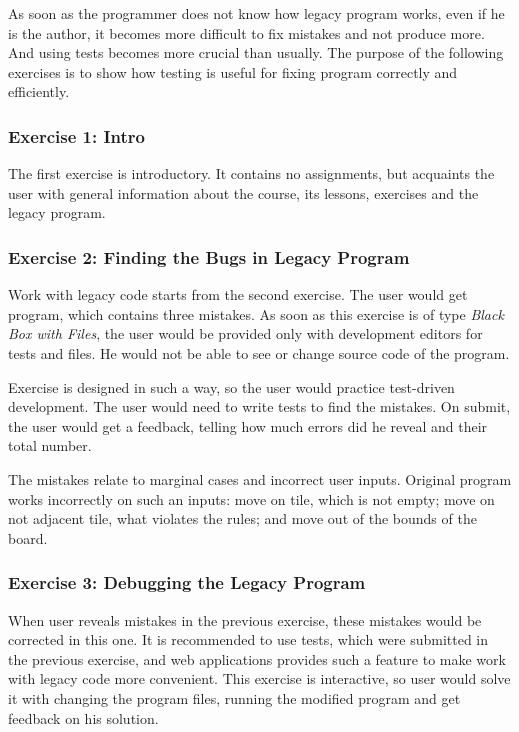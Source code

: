     As soon as the programmer does not know how legacy program works, even if he is the author, it becomes more difficult to fix mistakes and not produce more. And using tests becomes more crucial than usually. The purpose of the following exercises is to show how testing is useful for fixing program correctly and efficiently.
    
        \subsubsection{Exercise 1: Intro}
        The first exercise is introductory. It contains no assignments, but acquaints the user with general information about the course, its lessons, exercises and the legacy program.
        
        \subsubsection{Exercise 2: Finding the Bugs in Legacy Program}
        Work with legacy code starts from the second exercise. The user would get program, which contains three mistakes. As soon as this exercise is of type \textit{Black Box with Files}, the user would be provided only with development editors for tests and files. He would not be able to see or change source code of the program.
        
        Exercise is designed in such a way, so the user would practice test-driven development. The user would need to write tests to find the mistakes. On submit, the user would get a feedback, telling how much errors did he reveal and their total number.
        
        The mistakes relate to marginal cases and incorrect user inputs. Original program works incorrectly on such an inputs: move on tile, which is not empty; move on not adjacent tile, what violates the rules; and move out of the bounds of the board.
        
        \subsubsection{Exercise 3: Debugging the Legacy Program}
        When user reveals mistakes in the previous exercise, these mistakes would be corrected in this one. It is recommended to use tests, which were submitted in the previous exercise, and web applications provides such a feature to make work with legacy code more convenient. This exercise is interactive, so user would solve it with changing the program files, running the modified program and get feedback on his solution.
        
